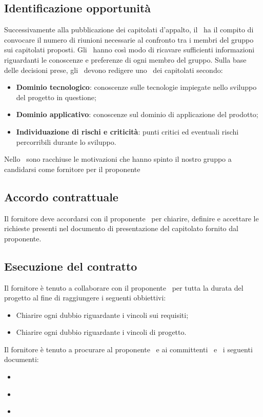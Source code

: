 \documentclass[../NormeDiProgetto.tex]{subfiles}
\begin{document}
		\subsection{Identificazione opportunità}
			Successivamente alla pubblicazione dei capitolati d'appalto, il
			\responsabilediprogetto\ ha il compito di convocare il numero
			di riunioni necessarie al confronto tra i membri del gruppo sui
			capitolati proposti. Gli \analisti\ hanno così modo di ricavare sufficienti informazioni riguardanti le conoscenze e preferenze di ogni
			membro del gruppo. Sulla base delle decisioni prese, gli
			\analisti\ devono redigere uno \studiodifattibilita\
			dei capitolati secondo:
			\begin{itemize}
				\item \textbf{Dominio tecnologico}: conoscenze sulle
				tecnologie impiegate nello sviluppo del progetto in questione;
				\item \textbf{Dominio applicativo}: conoscenze sul dominio di
				applicazione del prodotto;
				\item \textbf{Individuazione di rischi e criticità}: punti
				critici ed eventuali rischi percorribili durante lo sviluppo.
			\end{itemize}
			Nello \studiodifattibilita\ sono racchiuse le motivazioni che hanno spinto il nostro gruppo a candidarsi come fornitore per il proponente \proponente\
		\subsection{Accordo contrattuale}
			Il fornitore deve accordarsi con il proponente \proponente\ per chiarire, definire e accettare le richieste presenti nel documento di presentazione del capitolato fornito dal proponente.
		\subsection{Esecuzione del contratto}
			Il fornitore è tenuto a collaborare con il proponente \proponente\ per tutta la durata del progetto al fine di raggiungere i seguenti obbiettivi:
			\begin{itemize}
				\item Chiarire ogni dubbio riguardante i vincoli sui requisiti;
				\item Chiarire ogni dubbio riguardante i vincoli di progetto.
			\end{itemize}
			Il fornitore è tenuto a procurare al proponente \proponente\ e ai committenti \vardanega\ e \cardin\ i seguenti documenti:
			\begin{itemize}
				\item \pianodiprogetto\
				\item \analisideirequisiti\
				\item \pianodiqualifica\
			\end{itemize}
\end{document}
